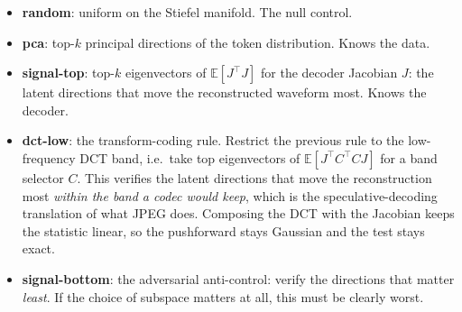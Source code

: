 \documentclass[10pt]{article}
\newcommand{\E}{\mathbb{E}}
\newcommand{\kk}{k}
\begin{document}
\begin{itemize}
\itemsep1pt
\item \textbf{random}: uniform on the Stiefel manifold. The null control.
\item \textbf{pca}: top-$\kk$ principal directions of the token distribution. Knows the data.
\item \textbf{signal-top}: top-$\kk$ eigenvectors of $\E[J^\top J]$ for the decoder Jacobian $J$:
the latent directions that move the reconstructed waveform most. Knows the decoder.
\item \textbf{dct-low}: the transform-coding rule. Restrict the previous rule to the low-frequency DCT
band, i.e.\ take top eigenvectors of $\E[J^\top C^\top C J]$ for a band selector $C$. This verifies
the latent directions that move the reconstruction most \emph{within the band a codec would keep},
which is the speculative-decoding translation of what JPEG does. Composing the DCT with the Jacobian
keeps the statistic linear, so the pushforward stays Gaussian and the test stays exact.
\item \textbf{signal-bottom}: the adversarial anti-control: verify the directions that matter
\emph{least}. If the choice of subspace matters at all, this must be clearly worst.
\end{itemize}
\end{document}
